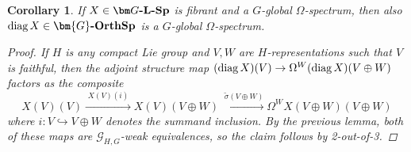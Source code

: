 \documentclass[reqno]{memo-l}
\theoremstyle{mythm}
\newtheorem{cor}[thm]{Corollary}
\theoremstyle{definition}
\numberwithin{equation}{section}
\newcommand{\cat}[1]{\textbf{\textup{#1}}}
\newcommand{\diag}{\textup{diag}}
\newcommand{\Gosp}[1]{\cat{$\bm{#1}$-OrthSp}}
\begin{document}
\begin{cor}
    If $X\in\cat{$\bm G$-$\cat{L}$-Sp}$ is fibrant and a $G$-global $\Omega$-spectrum, then also $\diag\,X\in\Gosp{G}$ is a $G$-global $\Omega$-spectrum.
    \begin{proof}
        If $H$ is any compact Lie group and $V,W$ are $H$-representations such that $V$ is faithful, then the adjoint structure map $(\diag\,X)(V)\to\Omega^W(\diag\,X)(V\oplus W)$ factors as the composite
        \[
            X(V)(V)\xrightarrow{\;X(V)(i)\;} X(V)(V\oplus W)\xrightarrow{\;\tilde\sigma(V\oplus W)}\Omega^WX(V\oplus W)(V\oplus W)   
        \]
        where $i\colon V\hookrightarrow V\oplus W$ denotes the summand inclusion. By the previous lemma, both of these maps are $\mathcal G_{H,G}$-weak equivalences, so the claim follows by 2-out-of-3.
    \end{proof}
\end{cor}
\end{document}
